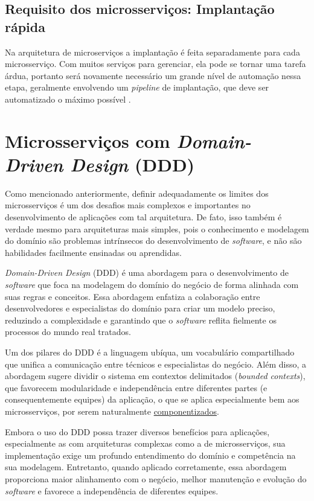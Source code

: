 \subsection{Requisito dos microsserviços: Implantação rápida}\label{boas-praticas-implantacao-rapida}

Na arquitetura de microserviços a implantação é feita separadamente para cada microsserviço. Com muitos serviços para gerenciar, ela pode se tornar uma tarefa árdua, portanto será novamente necessário um grande nível de automação nessa etapa, geralmente envolvendo um \emph{pipeline} de implantação, que deve ser automatizado o máximo possível \cite{martin-fowler-microservice-prereq}.

\section{Microsserviços com \emph{Domain-Driven Design} (DDD)}\label{section-ddd}

Como mencionado anteriormente, definir adequadamente os limites dos microsserviços é um dos desafios mais complexos e importantes no desenvolvimento de aplicações com tal arquitetura. De fato, isso também é verdade mesmo para arquiteturas mais simples, pois o conhecimento e modelagem do domínio são problemas intrínsecos do desenvolvimento de \emph{software}, e não são habilidades facilmente ensinadas ou aprendidas. 
\cite{livro-ddd}

\emph{Domain-Driven Design} (DDD) é uma abordagem para o desenvolvimento de \emph{software} que foca na modelagem do domínio do negócio de forma alinhada com suas regras e conceitos. Essa abordagem enfatiza a colaboração entre desenvolvedores e especialistas do domínio para criar um modelo preciso, reduzindo a complexidade e garantindo que o \emph{software} reflita fielmente os processos do mundo real tratados.
\cite{livro-ddd}

Um dos pilares do DDD é a linguagem ubíqua, um vocabulário compartilhado que unifica a comunicação entre técnicos e especialistas do negócio. Além disso, a abordagem sugere dividir o sistema em contextos delimitados (\emph{bounded contexts}), que favorecem modularidade e independência entre diferentes partes (e consequentemente equipes) da aplicação, o que se aplica especialmente bem aos microsserviços, por serem naturalmente \hyperref[secao-componentizacao]{componentizados}. 
\cite{livro-ddd}

Embora o uso do DDD possa trazer diversos benefícios para aplicações, especialmente as com arquiteturas complexas como a de microsserviços, sua implementação exige um profundo entendimento do domínio e competência na sua modelagem. Entretanto, quando aplicado corretamente, essa abordagem proporciona maior alinhamento com o negócio, melhor manutenção e evolução do \emph{software} e favorece a independência de diferentes equipes.
\cite{livro-ddd}


